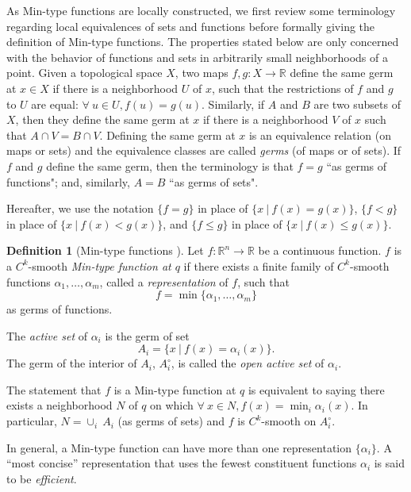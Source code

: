 \documentclass[11pt]{article}
\newcommand{\R}{\mathbb{R}}
\newcommand{\inter}{\cap}
\newcommand{\union}{\cup}
\theoremstyle{plain}
\theoremstyle{definition}
\newtheorem{defi}{Definition}
\theoremstyle{remark}
\begin{document}
As Min-type functions are locally constructed, we first review some terminology regarding local equivalences of sets and functions before formally giving the definition of Min-type functions. The properties stated below are only concerned with the behavior of functions and sets in arbitrarily small neighborhoods of a point. Given a topological space $X$, two maps $f, g : X \to \R$ define the same germ at $x \in X$ if there is a neighborhood $U$ of $x$, such that the restrictions of $f$ and $g$ to $U$ are equal: $\forall\ u \in U, f(u) = g(u)$.
Similarly, if $A$ and $B$ are two subsets of $X$, then they define the same germ at $x$ if there is a neighborhood $V$ of $x$ such that $A \inter V = B \inter V$.
Defining the same germ at $x$ is an equivalence relation (on maps or sets) and the equivalence classes are called \textit{germs} (of maps or of sets). If $f$ and $g$ define the same germ, then the terminology is that $f = g$ ``as germs of functions"; and, similarly, $A = B$ ``as germs of sets".

Hereafter, we use the notation $\{f = g\}$ in place of $\{x ~|~ f(x) = g(x)\}$, $\{f < g\}$ in place of $\{x ~|~ f(x) < g(x)\}$, and $\{f \leq g\}$ in place of $\{x ~|~ f(x) \leq g(x)\}$.

\begin{defi}[Min-type functions \citep{gershkovich_morse_1997}]
	\label{def:min_type}
	Let $f : \R^n \to \R$ be a continuous function. $f$ is a $C^k$-smooth \emph{Min-type function at $q$} if there exists a finite family of $C^k$-smooth functions $\alpha_1, \ldots, \alpha_m$, called a \emph{representation} of $f$, such that 
 \[f = \min \{\alpha_1,\ldots,\alpha_m\} \]
 as germs of functions.
\end{defi}

The \emph{active set} of $\alpha_i$ is the germ of set
	\[A_i = \{x ~|~ f(x) = \alpha_i(x)\}.\]
The germ of the interior of $A_i$, $A_i^\circ$, is called the \emph{open active set} of $\alpha_i$.

The statement that $f$ is a Min-type function at $q$ is equivalent to saying there exists a neighborhood $N$ of $q$ on which $\forall\ x \in N, f(x) = \min_{i} \alpha_i(x)$.
In particular, $N = \union_i ~ A_i$ (as germs of sets) and $f$ is $C^k$-smooth on $A_i^\circ$.

In general, a Min-type function can have more than one representation $\{ \alpha_i \}$. A ``most concise'' representation that uses the fewest constituent functions $\alpha_i$ is said to be \emph{efficient}.
\end{document}
